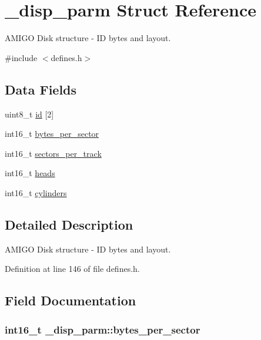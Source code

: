 \hypertarget{struct__disp__parm}{}\section{\+\_\+disp\+\_\+parm Struct Reference}
\label{struct__disp__parm}


A\+M\+I\+GO Disk structure -\/ ID bytes and layout.  




{\ttfamily \#include $<$defines.\+h$>$}

\subsection*{Data Fields}
\begin{DoxyCompactItemize}
\item 
uint8\+\_\+t \hyperlink{struct__disp__parm_adc781d8c48b2aa39c092fcb206f15e8c}{id} \mbox{[}2\mbox{]}
\item 
int16\+\_\+t \hyperlink{struct__disp__parm_ad575790e79a6bdf19bffcb8dda1df180}{bytes\+\_\+per\+\_\+sector}
\item 
int16\+\_\+t \hyperlink{struct__disp__parm_a870887d0582245d0c35f34724180463c}{sectors\+\_\+per\+\_\+track}
\item 
int16\+\_\+t \hyperlink{struct__disp__parm_a013e3f25cec51e3edfae124ed5d22cb9}{heads}
\item 
int16\+\_\+t \hyperlink{struct__disp__parm_ac4687d407f95a65e86313cde433832a4}{cylinders}
\end{DoxyCompactItemize}


\subsection{Detailed Description}
A\+M\+I\+GO Disk structure -\/ ID bytes and layout. 

Definition at line 146 of file defines.\+h.



\subsection{Field Documentation}
\subsubsection[{\texorpdfstring{bytes\+\_\+per\+\_\+sector}{bytes_per_sector}}]{\setlength{\rightskip}{0pt plus 5cm}int16\+\_\+t \+\_\+disp\+\_\+parm\+::bytes\+\_\+per\+\_\+sector}\hypertarget{struct__disp__parm_ad575790e79a6bdf19bffcb8dda1df180}{}\label{struct__disp__parm_ad575790e79a6bdf19bffcb8dda1df180}



